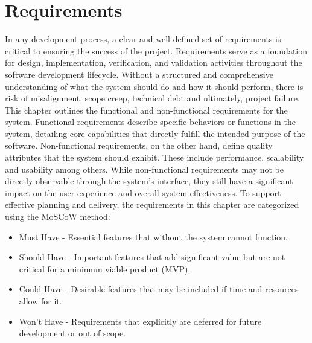 \chapter{Requirements}
\label{chap:requirements}

In any development process, a clear and well-defined set of requirements is critical
to ensuring the success of the project. Requirements serve as a foundation for design, implementation,
verification, and validation activities throughout the software development lifecycle.
Without a structured and comprehensive understanding of what the system should do and how it 
should perform, there is risk of misalignment, scope creep, technical debt and ultimately, 
project failure. This chapter outlines the functional and non-functional requirements for the 
system. Functional requirements describe specific behaviors or functions in the system, detailing
core capabilities that directly fulfill the intended purpose of the software.
Non-functional requirements, on the other hand, define quality attributes that the system
should exhibit. These include performance, scalability and usability among others. While
non-functional requirements may not be directly observable through the system's interface, they
still have a significant impact on the user experience and overall system effectiveness.
To support effective planning and delivery, the requirements in this chapter are categorized 
using the MoSCoW method:
\begin{itemize}
    \item Must Have - Essential features that without the system cannot function.
    \item Should Have - Important features that add significant value but are not critical 
    for a minimum viable product (MVP).
    \item Could Have - Desirable features that may be included if time and resources allow for it.
    \item Won't Have - Requirements that explicitly are deferred for future development or out of scope.
\end{itemize}



